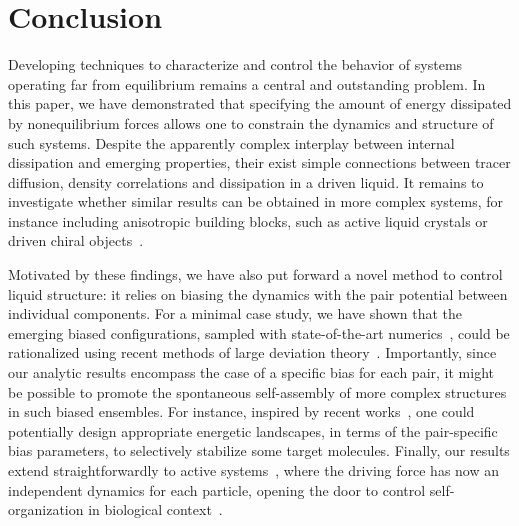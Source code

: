 \documentclass[pre, superscriptaddress, twocolumn,pre]{revtex4-1}
\begin{document}
\section{Conclusion}

Developing techniques to characterize and control the behavior of systems operating far from equilibrium remains a central and outstanding problem. In this paper, we have demonstrated that specifying the amount of energy dissipated by nonequilibrium forces allows one to constrain the dynamics and structure of such systems. Despite the apparently complex interplay between internal dissipation and emerging properties, their exist simple connections between tracer diffusion, density correlations and dissipation in a driven liquid. It remains to investigate whether similar results can be obtained in more complex systems, for instance including anisotropic building blocks, such as active liquid crystals or driven chiral objects~\cite{Joshi2017, VanZuiden2016, Nguyen2014b}.


Motivated by these findings, we have also put forward a novel method to control  liquid structure: it relies on biasing the dynamics with the pair potential between individual components. For a minimal case study, we have shown that the emerging biased configurations, sampled with state-of-the-art numerics~\cite{Giadina2006, tailleur2007probing, Hurtado2009, Nemoto2016, Ray2018, Klymko2018, Brewer2018}, could be rationalized using recent methods of large deviation theory~\cite{Chetrite2013, Jack2010}. Importantly, since our analytic results encompass the case of a specific bias for each pair, it might be possible to promote the spontaneous self-assembly of more complex structures in such biased ensembles. For instance, inspired by recent works~\cite{Murugan2015, Murugan2017b}, one could potentially design appropriate energetic landscapes, in terms of the pair-specific bias parameters, to selectively stabilize some target molecules. Finally, our results extend straightforwardly to active systems~\cite{Marchetti2013, Cates2015, Bechinger2016, Marchetti2018}, where the driving force has now an independent dynamics for each particle, opening the door to control self-organization in biological context~\cite{Sperandio2002, Brown2011, Betz2018}.




\end{document}

